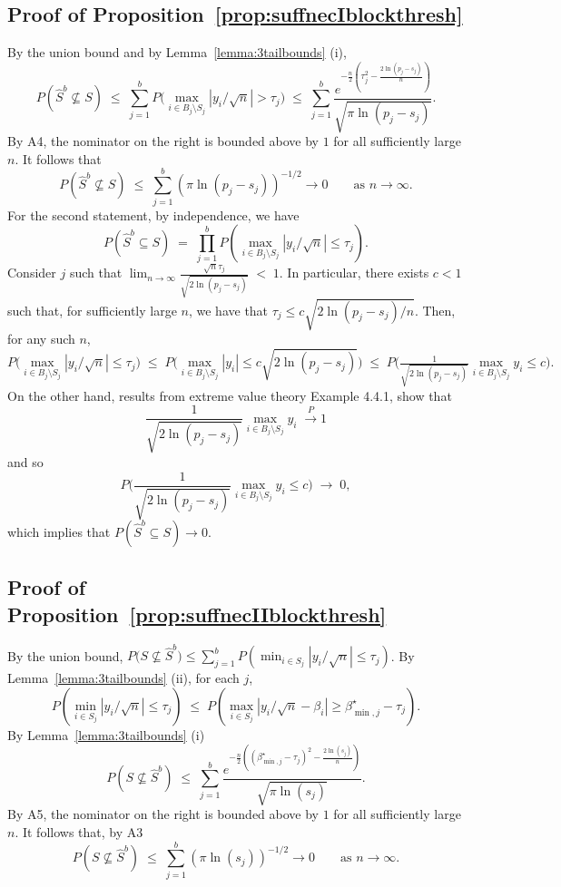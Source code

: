 \documentclass[aos]{imsart}
\theoremstyle{plain}
\begin{document}
\subsection{Proof of Proposition~\ref{prop:suffnecIblockthresh}} By the union bound and by Lemma~\ref{lemma:3tailbounds} (i),
\begin{equation}\label{eq:type1convrate}
P\left(\hat{S}^{b} \not\subseteq S\right)\;\leq\; \sum_{j=1}^b P\Big(\max_{i\in B_j\setminus S_j}|y_i/\sqrt{n}|>\tau_{j}\Big)\;\leq\;\sum_{j=1}^b\frac{e^{-\tfrac{n}{2}\left(\tau_j^2-\tfrac{2\ln(p_j-s_j)}{n}\right)}}{\sqrt{\pi\ln(p_j-s_j)}} 	.
 \end{equation}
 By A4, the nominator on the right is bounded above by $1$ for all sufficiently large $n$. It follows that 
	$$P\left(\hat{S}^{b} \not\subseteq S\right) \;\leq\; \sum_{j=1}^b (\pi\ln (p_j-s_j))^{-1/2} \to 0\qquad \mbox{as } n\to \infty.$$
For the second statement, by independence, we have 
$$P(\hat{S}^{b} \subseteq S)\;=\;\prod_{j=1}^b P(\max_{i \in B_j\setminus S_j}|y_i/\sqrt{n}| \leq \tau_j).$$ 
Consider $j$ such that $\lim_{n\to \infty} \frac{\sqrt{n}\tau_j}{\sqrt{2\ln(p_j-s_j)}} \;<\;1$. In particular, there exists $c<1$ such that, for sufficiently large $n$, we have that $\tau_j\leq c\sqrt{2\ln(p_j-s_j)/n}$. Then, for any such $n$,
$$
P\Big(\max_{i \in B_j\setminus S_j}|y_i/\sqrt{n}| \leq \tau_j\Big)\;\leq\; P\Big(\max_{i \in B_j\setminus S_j}|y_i| \leq c \sqrt{2\ln(p_j-s_j)}\Big)\;\leq\;P\Big(\tfrac{1}{\sqrt{2\ln(p_j-s_j)}}\max_{i \in B_j\setminus S_j}y_i \leq c \Big).
$$
On the other hand, results from extreme value theory\cite{galambos} Example 4.4.1, show that 
 $$\frac{1}{\sqrt{2 \ln(p_j-s_j)}}\max_{i\in B_j\setminus S_j}y_i \;\overset{P}{\longrightarrow} 1$$
 and so 
 $$
 P\Big(\frac{1}{\sqrt{2\ln(p_j-s_j)}}\max_{i \in B_j\setminus S_j}y_i \leq c \Big)\;\to\;0,
 $$ 
 which implies that $P(\hat{S}^{b} \subseteq S)\to 0$. 

\subsection{Proof of Proposition~\ref{prop:suffnecIIblockthresh}}
	 By the union bound, 
	$P\big(S \not\subseteq \hat{S}^{b}\big)\leq \sum_{j=1}^b  P\left(\min_{i\in S_j}|y_i/\sqrt{n}|\leq\tau_j\right)$. 
	By Lemma~\ref{lemma:3tailbounds} (ii), for each $j$,	
	$$P\left(\min_{i\in S_j}|y_i/\sqrt{n}|\leq\tau_j\right)\;\leq\; P\left(\max_{i\in S_j}|y_i/\sqrt{n}-\beta_i| \geq\beta_{\min,j}^{\star}-\tau_j \right).$$ By Lemma~\ref{lemma:3tailbounds} (i)  
	\begin{equation}\label{eq:type2convrate}
P\left(S \not\subseteq \hat{S}^{b} \right) \;\leq\;\sum_{j=1}^b\frac{e^{-\tfrac{n}{2}\left((\beta^\star_{\min,j}-\tau_j)^2-\tfrac{2\ln(s_j)}{n}\right)}}{\sqrt{\pi\ln(s_j)}}.		
	\end{equation}
 By A5, the nominator on the right is bounded above by $1$ for all sufficiently large $n$. It follows that, by A3 
	$$P\left(S \not\subseteq \hat{S}^{b} \right) \;\leq\;  \sum_{j=1}^b (\pi\ln (s_j))^{-1/2} \to 0\qquad \mbox{as } n\to \infty.$$ 
\end{document}
